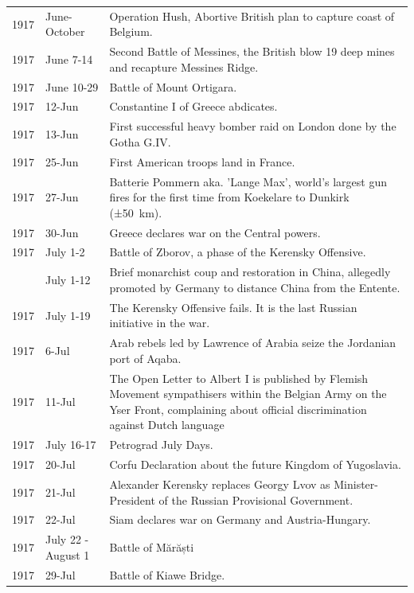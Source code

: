 \documentclass[
  openany]{book}
\begin{document}
\begin{longtable}[t]{rl>{\raggedright\arraybackslash}p{22em}}
\rowcolor{gray!6}  1917 & June-October & Operation Hush, Abortive British plan to capture coast of Belgium.\\
1917 & June 7-14 & Second Battle of Messines, the British blow 19 deep mines and recapture Messines Ridge.\\
\rowcolor{gray!6}  1917 & June 10-29 & Battle of Mount Ortigara.\\
1917 & 12-Jun & Constantine I of Greece abdicates.\\
\addlinespace
\rowcolor{gray!6}  1917 & 13-Jun & First successful heavy bomber raid on London done by the Gotha G.IV.\\
1917 & 25-Jun & First American troops land in France.\\
\rowcolor{gray!6}  1917 & 27-Jun & Batterie Pommern aka. 'Lange Max', world's largest gun fires for the first time from Koekelare to Dunkirk (±50 km).\\
1917 & 30-Jun & Greece declares war on the Central powers.\\
\rowcolor{gray!6}  1917 & July 1-2 & Battle of Zborov, a phase of the Kerensky Offensive.\\
\addlinespace
1917 & July 1-12 & Brief monarchist coup and restoration in China, allegedly promoted by Germany to distance China from the Entente.\\
\rowcolor{gray!6}  1917 & July 1-19 & The Kerensky Offensive fails. It is the last Russian initiative in the war.\\
1917 & 6-Jul & Arab rebels led by Lawrence of Arabia seize the Jordanian port of Aqaba.\\
\rowcolor{gray!6}  1917 & 11-Jul & The Open Letter to Albert I is published by Flemish Movement sympathisers within the Belgian Army on the Yser Front, complaining about official discrimination against Dutch language\\
1917 & July 16-17 & Petrograd July Days.\\
\addlinespace
\rowcolor{gray!6}  1917 & 20-Jul & Corfu Declaration about the future Kingdom of Yugoslavia.\\
1917 & 21-Jul & Alexander Kerensky replaces Georgy Lvov as Minister-President of the Russian Provisional Government.\\
\rowcolor{gray!6}  1917 & 22-Jul & Siam declares war on Germany and Austria-Hungary.\\
1917 & July 22 - August 1 & Battle of Mărăști\\
\rowcolor{gray!6}  1917 & 29-Jul & Battle of Kiawe Bridge.\\

\end{longtable}
\end{document}
